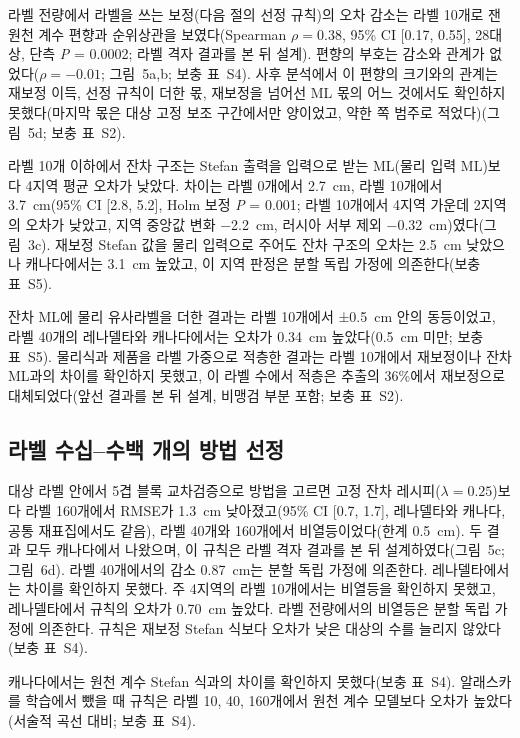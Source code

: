 라벨 전량에서 라벨을 쓰는 보정(다음 절의 선정 규칙)의 오차 감소는 라벨 10개로 잰 원천 계수 편향과 순위상관을 보였다(Spearman $\rho = 0.38$, 95\% CI [0.17, 0.55], 28대상, 단측 \textit{P} = 0.0002; 라벨 격자 결과를 본 뒤 설계).
편향의 부호는 감소와 관계가 없었다($\rho = -0.01$; 그림~5a,b; 보충 표~S4).
사후 분석에서 이 편향의 크기와의 관계는 재보정 이득, 선정 규칙이 더한 몫, 재보정을 넘어선 ML 몫의 어느 것에서도 확인하지 못했다(마지막 몫은 대상 고정 보조 구간에서만 양이었고, 약한 쪽 범주로 적었다)(그림~5d; 보충 표~S2).

라벨 10개 이하에서 잔차 구조는 Stefan 출력을 입력으로 받는 ML(물리 입력 ML)보다 4지역 평균 오차가 낮았다. 차이는 라벨 0개에서 2.7~cm, 라벨 10개에서 3.7~cm(95\% CI [2.8, 5.2], Holm 보정 \textit{P} = 0.001; 라벨 10개에서 4지역 가운데 2지역의 오차가 낮았고, 지역 중앙값 변화 −2.2~cm, 러시아 서부 제외 −0.32~cm)였다(그림~3c).
재보정 Stefan 값을 물리 입력으로 주어도 잔차 구조의 오차는 2.5~cm 낮았으나 캐나다에서는 3.1~cm 높았고, 이 지역 판정은 분할 독립 가정에 의존한다(보충 표~S5).

잔차 ML에 물리 유사라벨을 더한 결과는 라벨 10개에서 ±0.5~cm 안의 동등이었고, 라벨 40개의 레나델타와 캐나다에서는 오차가 0.34~cm 높았다(0.5~cm 미만; 보충 표~S5).
물리식과 제품을 라벨 가중으로 적층한 결과는 라벨 10개에서 재보정이나 잔차 ML과의 차이를 확인하지 못했고, 이 라벨 수에서 적층은 추출의 36\%에서 재보정으로 대체되었다(앞선 결과를 본 뒤 설계, 비맹검 부분 포함; 보충 표~S2).

\subsection{라벨 수십--수백 개의 방법 선정}\label{sec:results-selection}

대상 라벨 안에서 5겹 블록 교차검증으로 방법을 고르면 고정 잔차 레시피($\lambda = 0.25$)보다 라벨 160개에서 RMSE가 1.3~cm 낮아졌고(95\% CI [0.7, 1.7], 레나델타와 캐나다, 공통 재표집에서도 같음), 라벨 40개와 160개에서 비열등이었다(한계 0.5~cm). 두 결과 모두 캐나다에서 나왔으며, 이 규칙은 라벨 격자 결과를 본 뒤 설계하였다(그림~5c; 그림~6d).
라벨 40개에서의 감소 0.87~cm는 분할 독립 가정에 의존한다.
레나델타에서는 차이를 확인하지 못했다.
주 4지역의 라벨 10개에서는 비열등을 확인하지 못했고, 레나델타에서 규칙의 오차가 0.70~cm 높았다. 라벨 전량에서의 비열등은 분할 독립 가정에 의존한다.
규칙은 재보정 Stefan 식보다 오차가 낮은 대상의 수를 늘리지 않았다(보충 표~S4).

캐나다에서는 원천 계수 Stefan 식과의 차이를 확인하지 못했다(보충 표~S4).
알래스카를 학습에서 뺐을 때 규칙은 라벨 10, 40, 160개에서 원천 계수 모델보다 오차가 높았다(서술적 곡선 대비; 보충 표~S4).


